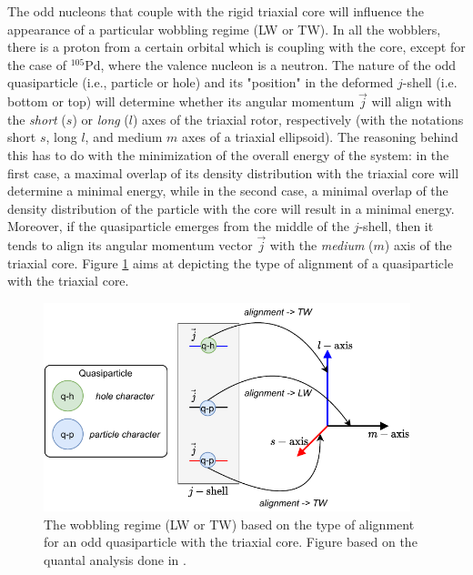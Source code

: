 \documentclass[11pt]{article}
\begin{document}
The odd nucleons that couple with the rigid triaxial core will influence the appearance of a particular wobbling regime (LW or TW). In all the wobblers, there is a proton from a certain orbital which is coupling with the core, except for the case of $^{105}$Pd, where the valence nucleon is a neutron. The nature of the odd quasiparticle (i.e., particle or hole) and its "position" in the deformed $j$-shell (i.e. bottom or top) will determine whether its angular momentum $\vec{j}$ will align with the \emph{short} ($s$) or \emph{long} ($l$) axes of the triaxial rotor, respectively (with the notations short $s$, long $l$, and medium $m$ axes of a triaxial ellipsoid). The reasoning behind this has to do with the minimization of the overall energy of the system: in the first case, a maximal overlap of its density distribution with the triaxial core will determine a minimal energy, while in the second case, a minimal overlap of the density distribution of the particle with the core will result in a minimal energy. Moreover, if the quasiparticle emerges from the middle of the $j$-shell, then it tends to align its angular momentum vector $\vec{j}$ with the \emph{medium} ($m$) axis of the triaxial core. Figure \ref{quasiparticle-alignment} aims at depicting the type of alignment of a quasiparticle with the triaxial core.

\begin{figure}
    \centering
    \includegraphics[width=0.95\textwidth]{figs/wobbling_Regimes.pdf}
    \caption{The wobbling regime (LW or TW) based on the type of alignment for an odd quasiparticle with the triaxial core. Figure based on the quantal analysis done in \cite{frauendorf2014transverse}.}
    \label{quasiparticle-alignment}
\end{figure}
\end{document}
